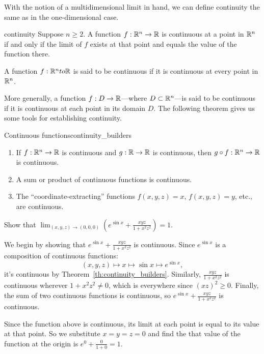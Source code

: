 \documentclass[svgnames]{report}
\begin{document}
With the notion of a multidimensional limit in hand, we can define
continuity the same as in the one-dimensional case. 

\begin{defn}{}{continuity}
  Suppose $n \geq 2$. A function $f: \mathbb{R}^n \to \mathbb{R}$ is continuous at a
  point in $\mathbb{R}^n$ if and only if the limit of $f$ exists at that point
  and equals the value of the function there.

  A function $f: \mathbb{R}^n to \mathbb{R}$ is said to be continuous if it is
  continuous at every point in $\mathbb{R}^n$. 
\end{defn}

More generally, a function $f:D \to \mathbb{R}$---where $D \subset \mathbb{R}^n$---is
said to be continuous if it is continuous at each point in its
domain $D$. The following theorem gives us some tools for establishing
continuity. 

\begin{theo}{Continuous functions}{continuity_builders}
  \begin{enumerate} 
    \item If $f : \mathbb{R}^n \to \mathbb{R}$ is continuous and $g: \mathbb{R} \to \mathbb{R}$
    is continuous, then $g\circ f :\mathbb{R}^n \to \mathbb{R}$ is
    continuous.
  \item A sum or product of continuous functions is continuous. 
  \item The ``coordinate-extracting'' functions $f(x,y,z) = x$, $f(x,y,z) = y$, etc., are
    continuous.
  \end{enumerate}
\end{theo}

\begin{example}{}{}
  Show that $\displaystyle{\lim_{(x,y,z) \to (0,0,0)}\left(e^{\sin x} + \frac{xyz}{1 + x^2
    z^2}\right)} = 1$. 
\end{example}

\begin{solution}
  We begin by showing that $e^{\sin x} + \frac{xyz}{1 + x^2 z^2}$ is
    continuous.  Since $e^{\sin x}$ is a composition of continuous
    functions:
  \[
  (x,y,z) \mapsto x \mapsto \sin x \mapsto e^{\sin x}, 
  \]
  it's continuous by Theorem~\ref{th:continuity_builders}. Similarly,
  $\frac{xyz}{1 + x^2 z^2}$ is continuous wherever $1 + x^2 z^2 \neq
  0$, which is everywhere since $(xz)^2 \geq 0$. Finally, the sum of
  two continuous functions is continuous, so $e^{\sin x} +
  \frac{xyz}{1 + x^2 z^2}$ is continuous.

  Since the function above is continuous, its limit at each point is
  equal to its value at that point. So we substitute $x=y=z=0$ and
  find the that value of the function at the origin is
  $e^0 + \frac{0}{1+0} = 1$.
\end{solution}
\end{document}
